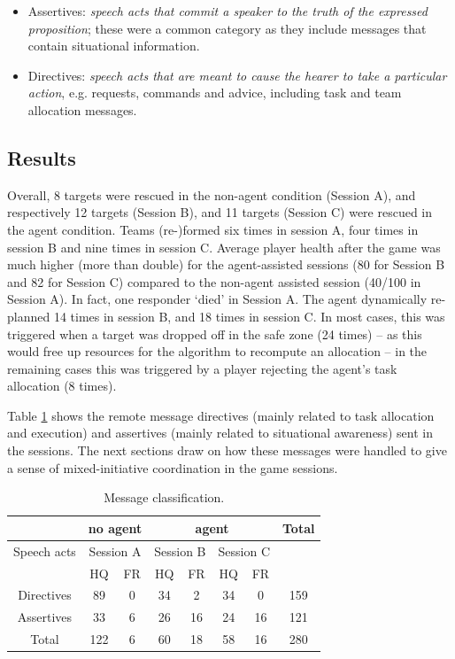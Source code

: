 \begin{itemize}
\item Assertives: \textit{speech acts that commit a speaker to the truth of the expressed proposition}; these were a common category as they include messages that contain situational information.
\item Directives: \textit{speech acts that are meant to cause the hearer to take a particular action}, e.g. requests, commands and advice, including task and team allocation messages. 
\end{itemize}

\subsection{Results}
\noindent Overall, 8 targets were rescued in the non-agent condition (Session A), and respectively 12 targets (Session B), and 11 targets (Session C) were rescued in the agent condition. Teams (re-)formed six times in session A, four times in session B and nine times  in session C. Average player health after the game was much higher (more than double) for the agent-assisted sessions (80 for Session B and 82 for Session C) compared to the non-agent assisted session (40/100 in Session A). In fact, one responder `died' in Session A.
The agent dynamically re-planned 14 times in session B, and 18 times in session C. In most cases, this was triggered when a target was dropped off in the safe zone (24 times) -- as this would free up resources for the algorithm to recompute an allocation -- in the remaining cases this was triggered by a player rejecting the agent's task allocation (8 times). 

Table \ref{tab:msgs} shows the remote message directives (mainly related to task allocation and execution) and assertives (mainly related to situational awareness) sent in the sessions. The next sections draw on how these messages were handled to give a sense of mixed-initiative coordination in the game sessions.

\begin{table}\footnotesize
\begin{tabular}{c | c c | c c c c | c}
 & \multicolumn{2}{c|}{no agent} &  \multicolumn{4}{c|}{agent} & Total \\
 \hline
 Speech acts & \multicolumn{2}{c|}{Session A} & \multicolumn{2}{c}{Session B} & \multicolumn{2}{c|}{Session C} & \\
  & HQ & FR & HQ & FR & HQ & FR & \\
  \hline
  Directives & 89 & 0 & 34 & 2 & 34 & 0 & 159 \\
  Assertives & 33 & 6 & 26 & 16 & 24 & 16 & 121 \\
  \hline
  Total & 122 & 6 & 60 & 18 & 58 & 16 & 280 \\
\end{tabular}

 \caption{Message classification.} \label{tab:msgs}
\end{table}


